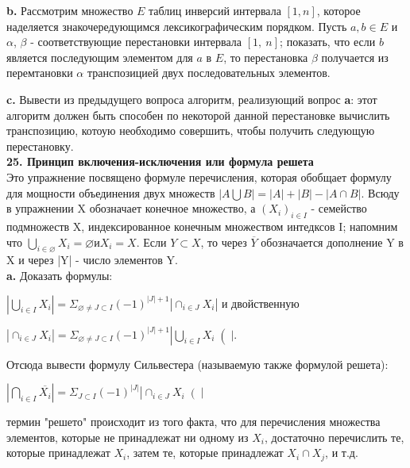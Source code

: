 \textbf{b.} Рассмотрим множество $E$ таблиц инверсий интервала $[1, n]$, которое наделяется знакочередующимся лексикографическим порядком. Пусть $a,b \in E$ и $\alpha$, $\beta$ - соответствующие перестановки интервала $[1,\: n]$; показать, что если $b$ является последующим элементом для $a$ в $E$, то перестановка $\beta$ получается из перемтановки $\alpha$ транспозицией двух последовательных элементов.\\
\newpage

\textbf{c.} Вывести из предыдущего вопроса алгоритм, реализующий вопрос \textbf{a}: этот алгоритм должен быть способен по некоторой данной перестановке вычислить транспозицию, котоую необходимо совершить, чтобы получить следующую перестановку.\\

\noindent
\textbf{25. Принцип включения-исключения или формула решета}\\

Это упражнение посвящено формуле перечисления, которая обобщает формулу для мощности объединения двух множеств $|A \bigcup B| = |A| + |B| - |A \cap B|$. Всюду в упражнении X обозначает конечное множество, а $(X_{i})_{i \in I}$ - семейство подмножеств X, индексированное конечным множеством интедксов I; напомним что $\bigcup _{i \in \varnothing} X_{i} = \varnothing и X_{i} = X.$ Если $Y \subset X$, то через $\overline{Y}$ обозначается дополнение Y в X и через |Y| - число элементов Y.\\

\textbf{a.} Доказать формулы:
\begin{center}
$\left|\bigcup_{i\in I} X_{i}\right| = \Sigma_{\varnothing \neq J \subset I} (-1)^{|J|+1 } \left|\cap_{i \in J} X_{i}\right| $ и двойственную
\end{center}
\begin{center}
$\left|\cap_{i \in J} X_{i}\right| = \Sigma_{\varnothing \neq J \subset I} (-1)^{|J|+1 } \left|\bigcup_{i \in I} X_{i}\right(|.$
\end{center}
Отсюда вывести формулу Сильвестера (называемую также формулой решета):
\begin{center}
$\left|\bigcap_{i \in I} \overline{X_{i}}\right| = \Sigma_{J \subset I} (-1)^{|J|} \left|\cap_{i \in J} X_{i}\right(|$
\end{center}
термин "решето" происходит из того факта, что для перечисления множества элементов, которые не принадлежат ни одному из $X_{i}$, достаточно перечислить те, которые принадлежат $X_{i}$, затем те, которые принадлежат $X_{i} \cap X_{j}$, и т.д.\\

